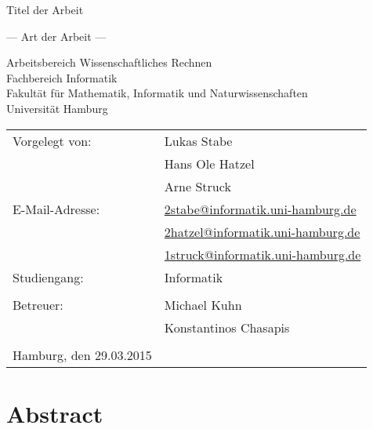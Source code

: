 \documentclass[
	12pt,
	a4paper,
	BCOR10mm,
	DIV14,
	listof=totoc,
	bibliography=totoc,
	headsepline
]{scrreprt}
\begin{document}
\begin{titlepage}
	\begin{center}
		{\titlefont\huge Titel der Arbeit\par}

		\bigskip
		\bigskip

		{\titlefont\Large --- Art der Arbeit ---\par}

		\bigskip
		\bigskip

		{\large Arbeitsbereich Wissenschaftliches Rechnen\\
		Fachbereich Informatik\\
		Fakultät für Mathematik, Informatik und Naturwissenschaften\\
		Universität Hamburg\par}
	\end{center}

	\vfill

	{\large \begin{tabular}{ll}
		Vorgelegt von: & Lukas Stabe \\
			& Hans Ole Hatzel \\
			& Arne Struck \\
		E-Mail-Adresse: 
			& \href{mailto:2stabe@informatik.uni-hamburg.de} {2stabe@informatik.uni-hamburg.de} \\			
			& \href{mailto:2hatzel@informatik.uni-hamburg.de}{2hatzel@informatik.uni-hamburg.de} \\
			& \href{mailto:1struck@informatik.uni-hamburg.de}{1struck@informatik.uni-hamburg.de} \\ 
		Studiengang: & Informatik \\
		\\
		Betreuer: & Michael Kuhn \\
			& Konstantinos Chasapis \\
		\\
		Hamburg, den 29.03.2015
	\end{tabular}\par}
\end{titlepage}

\chapter*{Abstract}

\thispagestyle{empty}

   

\tableofcontents
\end{document}

